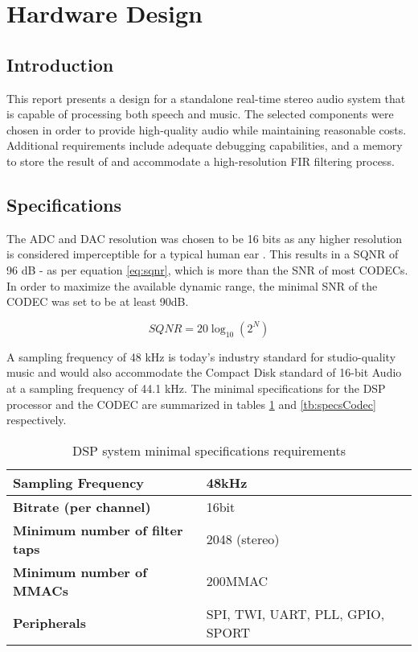 \section{Hardware Design}

\subsection{Introduction}
This report presents a design for a standalone real-time stereo audio system that is capable of processing both speech and music. The selected components were chosen in order to provide high-quality audio while maintaining reasonable costs. Additional requirements include adequate debugging capabilities, and a memory to store the result of and accommodate a high-resolution FIR filtering process.


\subsection{Specifications}
The ADC and DAC resolution was chosen to be 16 bits as any higher resolution is considered imperceptible for a typical human ear \autocite{jackson2014}. This results in a SQNR of 96 dB - as per equation \ref{eq:sqnr}, which is more than the SNR of most CODECs. In order to maximize the available dynamic range, the minimal SNR of the CODEC was set to be at least 90dB.

\begin{equation}\label{eq:sqnr}
SQNR = 20\log_{10}(2^N)    
\end{equation}


A sampling frequency of 48 kHz is today’s industry standard for studio-quality music \autocite{AES48khz} and would also accommodate the Compact Disk standard of 16-bit Audio at a sampling frequency of 44.1 kHz. The minimal specifications for the DSP processor and the CODEC are summarized in tables \ref{tb:specsDSP} and \ref{tb:specsCodec} respectively.




\begin{table}[h]
	\centering
	\begin{tabular}{|l|l|}
		\hline
		\textbf{Sampling Frequency}            & 48kHz                            \\ \hline
		\textbf{Bitrate (per channel)}         & 16bit                            \\ \hline
		\textbf{Minimum number of filter taps} & 2048 (stereo)                    \\ \hline
		\textbf{Minimum number of MMACs}       & 200MMAC                          \\ \hline
		\textbf{Peripherals}                   & SPI, TWI, UART, PLL, GPIO, SPORT \\ \hline
	\end{tabular}
	\caption{DSP system minimal specifications requirements}
	\label{tb:specsDSP}
\end{table}

